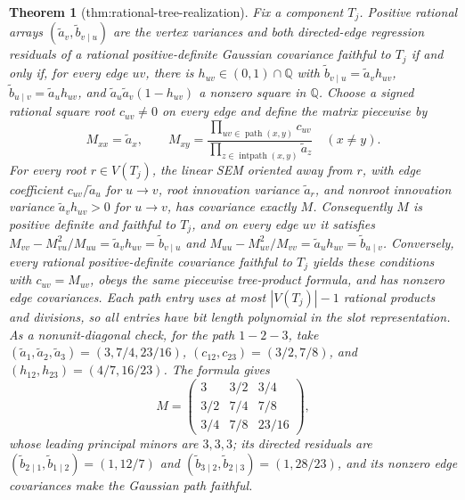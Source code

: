 \documentclass{article}
\newtheorem{theorem}{Theorem}
\begin{document}
\begin{theorem}[thm:rational-tree-realization]\label{thm:rational-tree-realization}
Fix a component \(T_j\). Positive rational arrays \((\widetilde a_v,\widetilde b_{v\mid u})\) are the vertex variances and both directed-edge regression residuals of a rational positive-definite Gaussian covariance faithful to \(T_j\) if and only if, for every edge \(uv\), there is \(h_{uv}\in(0,1)\cap\mathbb Q\) with \(\widetilde b_{v\mid u}=\widetilde a_vh_{uv}\), \(\widetilde b_{u\mid v}=\widetilde a_uh_{uv}\), and \(\widetilde a_u\widetilde a_v(1-h_{uv})\) a nonzero square in \(\mathbb Q\). Choose a signed rational square root \(c_{uv}\ne0\) on every edge and define the matrix piecewise by \[M_{xx}=\widetilde a_x,\qquad M_{xy}=\frac{\prod_{uv\in\operatorname{path}(x,y)}c_{uv}}{\prod_{z\in\operatorname{intpath}(x,y)}\widetilde a_z}\quad(x\ne y).\] For every root \(r\in V(T_j)\), the linear SEM oriented away from \(r\), with edge coefficient \(c_{uv}/\widetilde a_u\) for \(u\to v\), root innovation variance \(\widetilde a_r\), and nonroot innovation variance \(\widetilde a_vh_{uv}>0\) for \(u\to v\), has covariance exactly \(M\). Consequently \(M\) is positive definite and faithful to \(T_j\), and on every edge \(uv\) it satisfies \(M_{vv}-M_{vu}^{2}/M_{uu}=\widetilde a_vh_{uv}=\widetilde b_{v\mid u}\) and \(M_{uu}-M_{uv}^{2}/M_{vv}=\widetilde a_uh_{uv}=\widetilde b_{u\mid v}\). Conversely, every rational positive-definite covariance faithful to \(T_j\) yields these conditions with \(c_{uv}=M_{uv}\), obeys the same piecewise tree-product formula, and has nonzero edge covariances. Each path entry uses at most \(|V(T_j)|-1\) rational products and divisions, so all entries have bit length polynomial in the slot representation. As a nonunit-diagonal check, for the path \(1-2-3\), take \((\widetilde a_1,\widetilde a_2,\widetilde a_3)=(3,7/4,23/16)\), \((c_{12},c_{23})=(3/2,7/8)\), and \((h_{12},h_{23})=(4/7,16/23)\). The formula gives \[M=\begin{pmatrix}3&3/2&3/4\\3/2&7/4&7/8\\3/4&7/8&23/16\end{pmatrix},\] whose leading principal minors are \(3,3,3\); its directed residuals are \((\widetilde b_{2\mid1},\widetilde b_{1\mid2})=(1,12/7)\) and \((\widetilde b_{3\mid2},\widetilde b_{2\mid3})=(1,28/23)\), and its nonzero edge covariances make the Gaussian path faithful.
\end{theorem}
\end{document}
